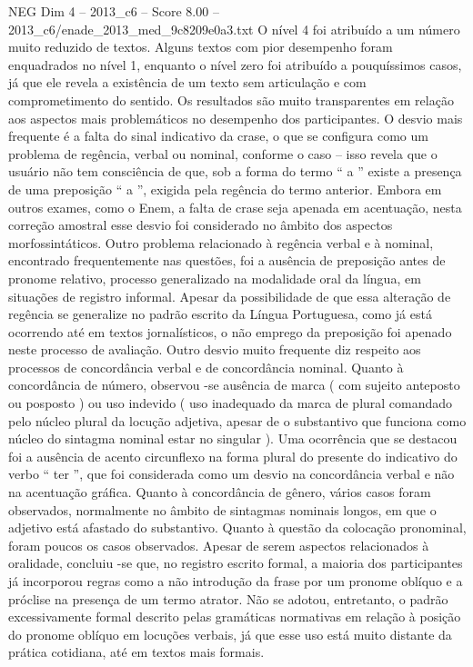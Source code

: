 \begin{textsample}{NEG Dim 4 – 2013\_c6 – Score 8.00 – 2013\_c6/enade\_2013\_med\_9c8209e0a3.txt}
O nível 4 foi atribuído a um número muito reduzido de textos.
Alguns textos com pior desempenho foram enquadrados no nível 1, enquanto o nível zero foi atribuído a pouquíssimos casos, já que ele revela a existência de um texto sem articulação e com comprometimento do sentido.
Os resultados são muito transparentes em relação aos aspectos mais problemáticos no desempenho dos participantes.
O desvio mais frequente é a falta do sinal indicativo da crase, o que se configura como um problema de regência, verbal ou nominal, conforme o caso – isso revela que o usuário não tem consciência de que, sob a forma do termo “ a ” existe a presença de uma preposição “ a ”, exigida pela regência do termo anterior.
Embora em outros exames, como o Enem, a falta de crase seja apenada em acentuação, nesta correção amostral esse desvio foi considerado no âmbito dos aspectos morfossintáticos.
Outro problema relacionado à regência verbal e à nominal, encontrado frequentemente nas questões, foi a ausência de preposição antes de pronome relativo, processo generalizado na modalidade oral da língua, em situações de registro informal.
Apesar da possibilidade de que essa alteração de regência se generalize no padrão escrito da Língua Portuguesa, como já está ocorrendo até em textos jornalísticos, o não emprego da preposição foi apenado neste processo de avaliação.
Outro desvio muito frequente diz respeito aos processos de concordância verbal e de concordância nominal.
Quanto à concordância de número, observou -se ausência de marca ( com sujeito anteposto ou posposto ) ou uso indevido ( uso inadequado da marca de plural comandado pelo núcleo plural da locução adjetiva, apesar de o substantivo que funciona como núcleo do sintagma nominal estar no singular ).
Uma ocorrência que se destacou foi a ausência de acento circunflexo na forma plural do presente do indicativo do verbo “ ter ”, que foi considerada como um desvio na concordância verbal e não na acentuação gráfica.
Quanto à concordância de gênero, vários casos foram observados, normalmente no âmbito de sintagmas nominais longos, em que o adjetivo está afastado do substantivo.
Quanto à questão da colocação pronominal, foram poucos os casos observados.
Apesar de serem aspectos relacionados à oralidade, concluiu -se que, no registro escrito formal, a maioria dos participantes já incorporou regras como a não introdução da frase por um pronome oblíquo e a próclise na presença de um termo atrator.
Não se adotou, entretanto, o padrão excessivamente formal descrito pelas gramáticas normativas em relação à posição do pronome oblíquo em locuções verbais, já que esse uso está muito distante da prática cotidiana, até em textos mais formais.

\end{textsample}
